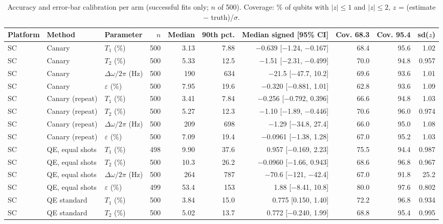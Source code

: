 \begin{table}[!t]
\centering
\footnotesize
\caption{Accuracy and error-bar calibration per arm (successful fits only; $n$ of 500). Coverage: \% of qubits with $|z| \leq 1$ and $|z| \leq 2$, $z$ = (estimate $-$ truth)/$\sigma$.}
\label{tab:s1}
\begin{adjustbox}{max width=\linewidth}
\begin{tabular}{lllrrrrrrr}
\hline
Platform & Method & Parameter & $n$ & Median & 90th pct. & Median signed [95\% CI] & Cov. 68.3 & Cov. 95.4 & sd($z$) \\
\hline
SC & Canary & $T_1$ (\%) & 500 & 3.13 & 7.88 & $-$0.639 [$-$1.24, $-$0.167] & 68.4 & 95.6 & 1.02 \\
SC & Canary & $T_2$ (\%) & 500 & 5.33 & 12.5 & $-$1.51 [$-$2.31, $-$0.499] & 70.0 & 94.8 & 0.957 \\
SC & Canary & $\Delta\omega/2\pi$ (Hz) & 500 & 190 & 634 & $-$21.5 [$-$47.7, 10.2] & 69.6 & 93.6 & 1.01 \\
SC & Canary & $\varepsilon$ (\%) & 500 & 7.95 & 19.6 & $-$0.320 [$-$0.881, 1.01] & 62.8 & 93.6 & 1.09 \\
\hline
SC & Canary (repeat) & $T_1$ (\%) & 500 & 3.41 & 7.84 & $-$0.256 [$-$0.792, 0.396] & 66.6 & 94.8 & 1.03 \\
SC & Canary (repeat) & $T_2$ (\%) & 500 & 5.27 & 12.3 & $-$1.10 [$-$1.89, $-$0.446] & 70.6 & 96.0 & 0.974 \\
SC & Canary (repeat) & $\Delta\omega/2\pi$ (Hz) & 500 & 209 & 698 & $-$1.29 [$-$34.8, 27.4] & 66.0 & 95.0 & 1.08 \\
SC & Canary (repeat) & $\varepsilon$ (\%) & 500 & 7.09 & 19.4 & $-$0.0961 [$-$1.38, 1.28] & 67.0 & 95.2 & 1.03 \\
\hline
SC & QE, equal shots & $T_1$ (\%) & 498 & 9.90 & 37.6 & 0.957 [$-$0.169, 2.23] & 75.5 & 94.4 & 0.987 \\
SC & QE, equal shots & $T_2$ (\%) & 500 & 10.3 & 26.2 & $-$0.0960 [$-$1.66, 0.943] & 68.6 & 96.8 & 0.967 \\
SC & QE, equal shots & $\Delta\omega/2\pi$ (Hz) & 500 & 264 & 787 & $-$70.6 [$-$121, $-$42.4] & 67.0 & 91.8 & 25.2 \\
SC & QE, equal shots & $\varepsilon$ (\%) & 499 & 53.4 & 153 & 1.88 [$-$8.41, 10.8] & 80.0 & 97.6 & 0.802 \\
\hline
SC & QE standard & $T_1$ (\%) & 500 & 3.84 & 15.0 & 0.775 [0.150, 1.40] & 72.2 & 96.8 & 0.934 \\
SC & QE standard & $T_2$ (\%) & 500 & 5.02 & 13.7 & 0.772 [$-$0.240, 1.99] & 68.8 & 95.4 & 0.995 \\

\end{tabular}
\end{adjustbox}
\end{table}
